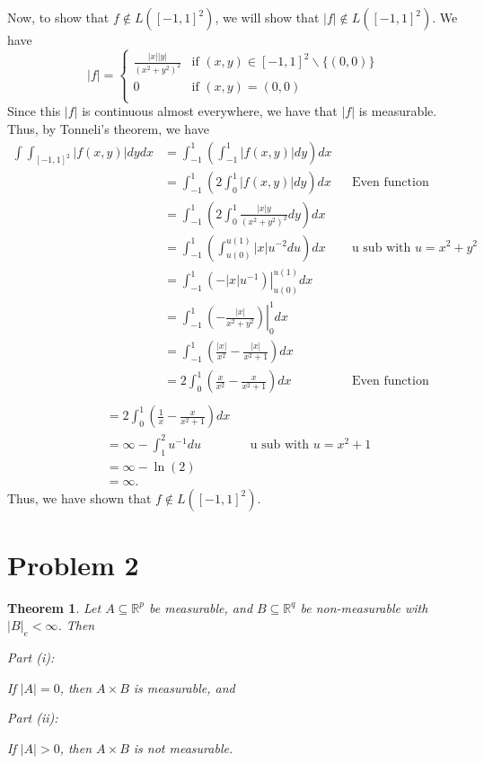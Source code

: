 \documentclass[10pt,a4paper]{article}
\makeatletter
\theoremstyle{theorem}
\newtheorem{theorem}{Theorem}
\newcommand{\proofpart}[2]{%
  \par
  \addvspace{\medskipamount}%
  \noindent\emph{Part #1: #2}\par\nobreak
  \addvspace{\smallskipamount}%
  \@afterheading
}
\theoremstyle{definition}
\makeatother
\begin{document}
Now, to show that $f \not \in L([-1, 1]^2)$, we will show that $|f| \not \in L([-1, 1]^2)$. We have
\[   |f| = \left\{
\begin{array}{ll}
      \frac{|x||y|}{(x^2 + y^2)^2} & \text{if } (x, y) \in [-1, 1]^2 \backslash \{(0, 0)\} \\
      0 & \text{if } (x, y) = (0, 0)\\
\end{array} 
\right. \]
Since this $|f|$ is continuous almost everywhere, we have that $|f|$ is measurable. Thus, by Tonneli's theorem, we have
\begin{align*}
\int \int_{[-1, 1]^2} |f(x, y)| dy dx &= \int_{-1}^1 \left( \int_{-1}^1 |f(x, y)| dy \right) dx\\
&= \int_{-1}^1 \left( 2\int_{0}^1 |f(x, y)| dy \right) dx &&\text{Even function over symmetric bounds}\\
&= \int_{-1}^1 \left( 2\int_{0}^1 \frac{|x|y}{(x^2 + y^2)^2} dy \right) dx\\
&= \int_{-1}^1 \left( \int_{u(0)}^{u(1)} |x| u^{-2} du \right) dx && \text{u sub with } u = x^2 + y^2\\
&= \int_{-1}^1 \left. \left( -|x| u^{-1} \right) \right|_{u(0)}^{u(1)} dx\\
&= \int_{-1}^1 \left. \left( -\frac{|x|}{x^2 + y^2} \right) \right|_{0}^{1} dx\\
&= \int_{-1}^1 \left( \frac{|x|}{x^2} -\frac{|x|}{x^2 + 1} \right) dx\\
&= 2\int_{0}^1 \left( \frac{x}{x^2} -\frac{x}{x^2 + 1} \right) dx&&\text{Even function over symmetric bounds}\\
\end{align*}
\begin{align*}
&= 2\int_{0}^1 \left( \frac{1}{x} -\frac{x}{x^2 + 1} \right) dx\\
&= \infty - \int_{1}^2 u^{-1} du &&\text{u sub with } u = x^2 + 1\\
&= \infty - \ln (2)\\
&= \infty.
\end{align*}
Thus, we have shown that $f \not \in L([-1, 1]^2)$.

\section*{Problem 2}
\begin{theorem}
Let $A \subseteq \mathbb{R}^p$ be measurable, and $B \subseteq \mathbb{R}^q$ be non-measurable with $|B|_e < \infty$. Then
\proofpart{(i)}{} If $|A| = 0$, then $A \times B$ is measurable, and
\proofpart{(ii)}{} If $|A| > 0$, then $A \times B$ is not measurable.
\end{theorem}
\end{document}
